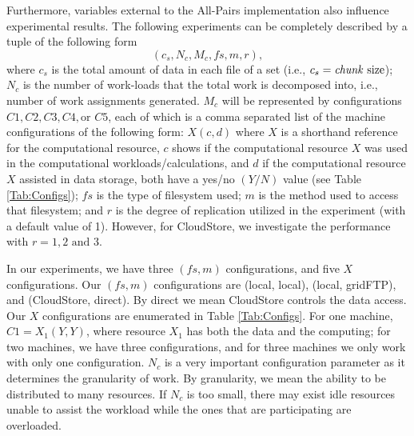 \documentclass{rspublic}
\begin{document}
Furthermore, variables external to the All-Pairs implementation also
influence experimental results. The following experiments can be
completely described by a tuple of the following form
 \begin{equation}
(c_s, N_c, M_c, f\!s, m,r),
\label{Eq:tuple}
\end{equation}
where $c_s$ is the total amount of data in each file of a set (i.e.,
$c_s=\mbox{\textit{chunk} size}$); $N_c$ is the number of work-loads
that the total work is decomposed into, i.e., number of work assignments
generated. $M_c$ will be
represented by configurations $C1, C2, C3, C4, \mbox{or } C5$, each of
which is a comma separated list of the machine configurations of the
following form: $X(c, d)$ where $X$ is a shorthand reference for the
computational resource, $c$ shows if the computational resource $X$ was
used in the computational workloads/calculations, and $d$ if the
computational resource $X$ assisted in data storage, both have a yes/no
$(Y/N)$ value (see Table \ref{Tab:Configs}); $f\!s$ is the type of
filesystem used; $m$ is the method used to access that filesystem; and
$r$ is the degree of replication utilized in the experiment (with a
default value of 1).  However, for CloudStore, we investigate the
performance with $r = 1, 2
\mbox{ and } 3$.

In our experiments, we have three $(f\!s, m)$ configurations, and five
$X$ configurations. Our $(f\!s, m)$ configurations are (local, local),
(local, gridFTP), and (CloudStore, direct). By direct we mean CloudStore
controls the data access. Our $X$ configurations are enumerated in Table
\ref{Tab:Configs}. For one machine, $C1=X_1(Y,Y)$, where resource $X_1$
has both the data and the computing; for two machines, we have three
configurations, and for three machines we only work with only one
configuration. $N_c$ is a very important configuration parameter as it
determines the granularity of work. By granularity, we mean the ability
to be distributed to many resources.  If $N_c$ is too small, there may
exist idle resources unable to assist the workload while the ones that
are participating are overloaded.
\end{document}
